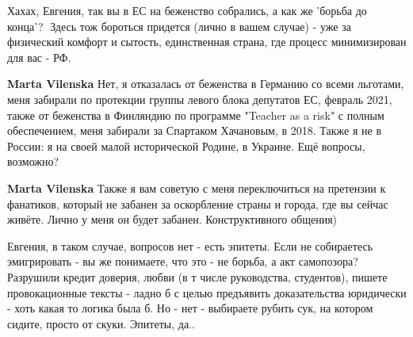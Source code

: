 \begin{itemize}
\begin{itemize}
 
Хахах, Евгения, так вы в ЕС на беженство собрались, а как же 'борьба до конца'?🤣 Здесь тож бороться придется (лично в вашем случае) - уже за физический комфорт и сытость, единственная страна, где процесс минимизирован для вас - РФ.

 
\textbf{Marta Vilenska} Нет, я отказалась от беженства в Германию со всеми
льготами, меня забирали по протекции группы левого блока депутатов ЕС, февраль
2021, также от беженства в Финляндию по программе "Teacher as a risk" с полным
обеспечением, меня забирали за Спартаком Хачановым, в 2018. Также я не в
России: я на своей малой исторической Родине, в Украине. Ещё вопросы, возможно?

 
\textbf{Marta Vilenska} Также я вам советую с меня переключиться на претензии к фанатиков, который не забанен за оскорбление страны и города, где вы сейчас живёте. Лично у меня он будет забанен. Конструктивного общения)

 
Евгения, в таком случае, вопросов нет - есть эпитеты. Если не собираетесь эмигрировать - вы же понимаете, что это - не борьба, а акт самопозора? Разрушили кредит доверия, любви (в т числе руководства, студентов), пишете провокационные тексты - ладно б с целью предъявить доказательства юридически - хоть какая то логика была б. Но - нет - выбираете рубить сук, на котором сидите, просто от скуки. Эпитеты, да..


\end{itemize}
\end{itemize}
